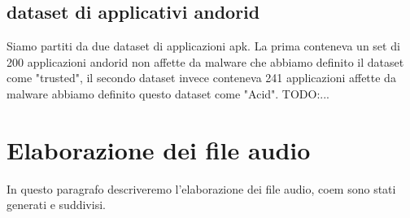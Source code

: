 \subsection{dataset di applicativi andorid}
Siamo partiti da due dataset di applicazioni apk. La prima conteneva un set di 200 applicazioni andorid non affette da malware che abbiamo definito il dataset come "trusted", il secondo dataset invece conteneva 241 applicazioni affette da malware abbiamo definito questo dataset come "Acid". TODO:...
\section{Elaborazione dei file audio}
In questo paragrafo descriveremo l'elaborazione dei file audio, coem sono stati generati e suddivisi.

